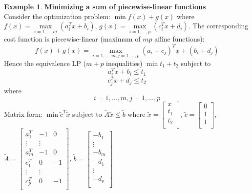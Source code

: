 \documentclass[10pt]{article}
\theoremstyle{definition}
\newtheorem{example}{Example}[section]
\begin{document}
\begin{example}
	\textbf{Minimizing a sum of piecewise-linear functions}\\
	Consider the optimization problem:
	$\min f(x) + g(x)$
	where
	$f(x) = \max\limits_{i=1,...,m}(a_{i}^Tx+b_i)$,
	$g(x) = \max\limits_{i=1,...,p}(c_{i}^Tx+d_i)$.
	The corresponding cost function is piecewise-linear (maximum of $mp$ affine functions):
	$$f(x) + g(x) = \max\limits_{i=1,...,m; j=1,...,p} (a_i+c_j)^Tx + (b_i+d_j)$$
	Hence the equivalence LP ($m + p$ inequalities)
	$\min t_1 + t_2$
	subject to
	$$a_{i}^Tx + b_i \le t_1$$
	$$c_{j}^Tx + d_j \le t_2$$
	where $$i = 1, ..., m, j=1,...,p$$
	Matrix form:
	$\min \tilde{c}^T\tilde{x}$
	subject to
	$\tilde{A}\tilde{x} \le \tilde{b}$
	where
	$\tilde{x} = \begin{bmatrix} x\\ t_1\\ t_2\\ \end{bmatrix}$, $\tilde{c} = \begin{bmatrix} 0\\ 1\\ 1\\ \end{bmatrix}$, $\tilde{A} = \begin{bmatrix} a_{1}^T & -1 & 0\\ \vdots & \vdots \\ a_{m}^T & -1 & 0\\ c_{1}^T & 0 & -1\\ \vdots & \vdots \\ c_{p}^T & 0 & -1\\ \end{bmatrix}$, $\tilde{b} = \begin{bmatrix} -b_1\\ \vdots \\ -b_m \\ -d_1\\ \vdots \\ -d_p \\ \end{bmatrix}$
\end{example}
\end{document}
